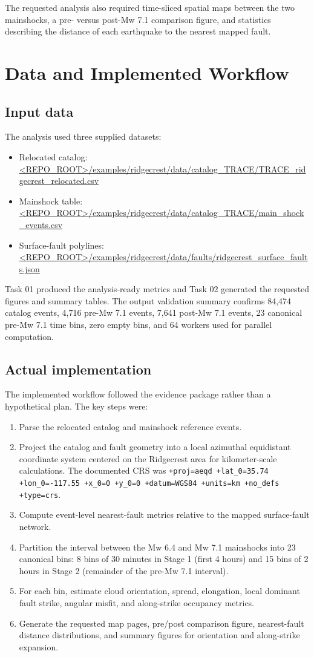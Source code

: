 \documentclass[11pt]{article}
\begin{document}
The requested analysis also required time-sliced spatial maps between the two mainshocks, a pre- versus post-Mw 7.1 comparison figure, and statistics describing the distance of each earthquake to the nearest mapped fault.

\section{Data and Implemented Workflow}
\subsection{Input data}
The analysis used three supplied datasets:
\begin{itemize}
    \item Relocated catalog: \url{<REPO_ROOT>/examples/ridgecrest/data/catalog_TRACE/TRACE_ridgecrest_relocated.csv}
    \item Mainshock table: \url{<REPO_ROOT>/examples/ridgecrest/data/catalog_TRACE/main_shock_events.csv}
    \item Surface-fault polylines: \url{<REPO_ROOT>/examples/ridgecrest/data/faults/ridgecrest_surface_faults.json}
\end{itemize}

Task 01 produced the analysis-ready metrics and Task 02 generated the requested figures and summary tables. The output validation summary confirms 84,474 catalog events, 4,716 pre-Mw 7.1 events, 7,641 post-Mw 7.1 events, 23 canonical pre-Mw 7.1 time bins, zero empty bins, and 64 workers used for parallel computation.

\subsection{Actual implementation}
The implemented workflow followed the evidence package rather than a hypothetical plan. The key steps were:
\begin{enumerate}[label=\arabic*.]
    \item Parse the relocated catalog and mainshock reference events.
    \item Project the catalog and fault geometry into a local azimuthal equidistant coordinate system centered on the Ridgecrest area for kilometer-scale calculations. The documented CRS was \texttt{+proj=aeqd +lat\_0=35.74 +lon\_0=-117.55 +x\_0=0 +y\_0=0 +datum=WGS84 +units=km +no\_defs +type=crs}.
    \item Compute event-level nearest-fault metrics relative to the mapped surface-fault network.
    \item Partition the interval between the Mw 6.4 and Mw 7.1 mainshocks into 23 canonical bins: 8 bins of 30 minutes in Stage 1 (first 4 hours) and 15 bins of 2 hours in Stage 2 (remainder of the pre-Mw 7.1 interval).
    \item For each bin, estimate cloud orientation, spread, elongation, local dominant fault strike, angular misfit, and along-strike occupancy metrics.
    \item Generate the requested map pages, pre/post comparison figure, nearest-fault distance distributions, and summary figures for orientation and along-strike expansion.
\end{enumerate}
\end{document}
